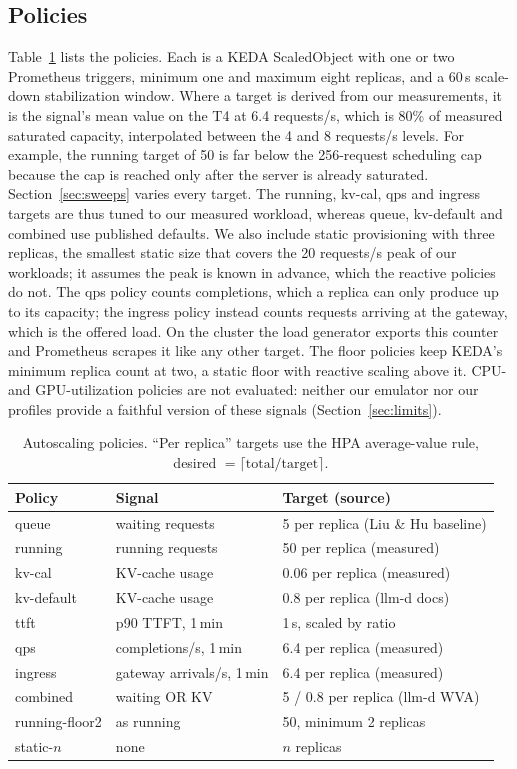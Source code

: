 \documentclass[10pt,conference]{IEEEtran}
\begin{document}
\subsection{Policies}
Table~\ref{tab:policies} lists the policies. Each is a KEDA ScaledObject with
one or two Prometheus triggers, minimum one and maximum eight replicas, and a
60\,s scale-down stabilization window. Where a target is derived from our
measurements, it is the signal's mean value on the T4 at 6.4 requests/s, which is
80\% of measured saturated capacity, interpolated between the 4 and
8 requests/s levels. For example, the running target of 50 is far below the
256-request scheduling cap because the cap is reached only after the server is
already saturated. Section~\ref{sec:sweeps} varies every target. The running,
kv-cal, qps and ingress targets are thus tuned to our measured workload,
whereas queue, kv-default and combined use published defaults. We also
include static provisioning with three replicas, the smallest static size
that covers the 20 requests/s peak of our workloads; it assumes the peak is
known in advance, which the reactive policies do not.
The qps policy counts completions, which a replica can only produce up to its
capacity; the ingress policy instead counts requests arriving at the gateway,
which is the offered load. On the cluster the load generator exports this
counter and Prometheus scrapes it like any other target. The floor policies
keep KEDA's minimum replica count at two, a static floor with reactive scaling
above it.
CPU- and GPU-utilization policies are not evaluated: neither our emulator nor our
profiles provide a faithful version of these signals
(Section~\ref{sec:limits}).

\begin{table}[t]
\centering
\caption{Autoscaling policies. ``Per replica'' targets use the HPA
average-value rule, desired $=\lceil \text{total}/\text{target}\rceil$.}
\label{tab:policies}
\small
\begin{tabular}{lp{2.6cm}p{3.1cm}}
\toprule
Policy & Signal & Target (source) \\
\midrule
queue      & waiting requests & 5 per replica (Liu \& Hu baseline) \\
running    & running requests & 50 per replica (measured) \\
kv-cal     & KV-cache usage & 0.06 per replica (measured) \\
kv-default & KV-cache usage & 0.8 per replica (llm-d docs) \\
ttft       & p90 TTFT, 1\,min & 1\,s, scaled by ratio \\
qps        & completions/s, 1\,min & 6.4 per replica (measured) \\
ingress    & gateway arrivals/s, 1\,min & 6.4 per replica (measured) \\
combined   & waiting OR KV & 5 / 0.8 per replica (llm-d WVA) \\
running-floor2 & as running & 50, minimum 2 replicas \\
static-$n$ & none & $n$ replicas \\
\bottomrule
\end{tabular}
\end{table}
\end{document}
